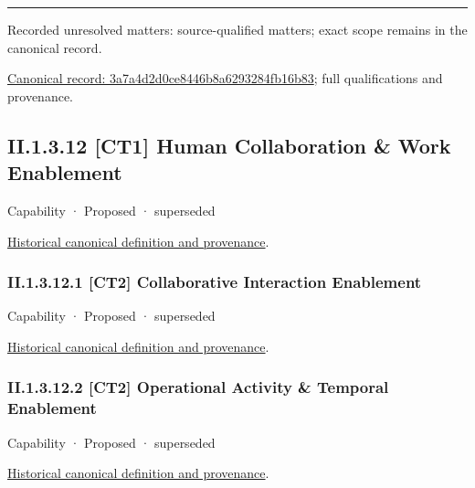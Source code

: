 \medskip\hrule\medskip

{\small Recorded unresolved matters: source-qualified matters; exact scope remains in the canonical record.}\par
{\footnotesize \href{../../../../continuum/strategy/capability/3a7a4d2d0ce8446b8a6293284fb16b83.md}{Canonical record: 3a7a4d2d0ce8446b8a6293284fb16b83}; full qualifications and provenance.}\par
\subsection*{II.1.3.12 [CT1] Human Collaboration \& Work Enablement}
\label{navigation:II.1.3.12}

\label{element:c9347f73b21242c5b8cce41252b74da0}
{\small Capability · Proposed · superseded}\par
\href{../../../../continuum/strategy/capability/c9347f73b21242c5b8cce41252b74da0.md}{Historical canonical definition and provenance}.\par
\subsubsection*{II.1.3.12.1 [CT2] Collaborative Interaction Enablement}
\label{navigation:II.1.3.12.1}

\label{element:6140b21c874241d092708e2411caceed}
{\small Capability · Proposed · superseded}\par
\href{../../../../continuum/strategy/capability/6140b21c874241d092708e2411caceed.md}{Historical canonical definition and provenance}.\par
\subsubsection*{II.1.3.12.2 [CT2] Operational Activity \& Temporal Enablement}
\label{navigation:II.1.3.12.2}

\label{element:ca96b2b2ff434854995711e403e95f6f}
{\small Capability · Proposed · superseded}\par
\href{../../../../continuum/strategy/capability/ca96b2b2ff434854995711e403e95f6f.md}{Historical canonical definition and provenance}.\par

